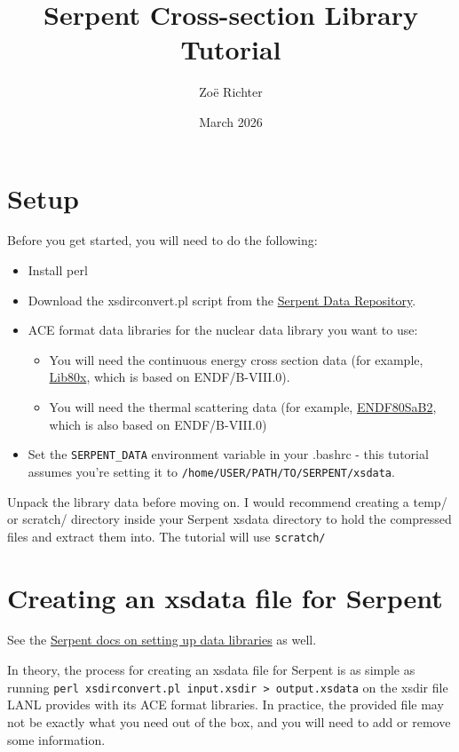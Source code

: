 \documentclass[12pt, letterpaper]{article}
\title{Serpent Cross-section Library Tutorial}
\author{Zo\"e Richter}
\date{March 2026}
\begin{document}
\maketitle

\section{Setup}
Before you get started, you will need to do the following:
\begin{itemize}
\item Install perl
\item Download the xsdirconvert.pl script from the \href{https://serpent.vtt.fi/docs/data/interaction_data.html#repository-interaction-data}{Serpent Data Repository}.
\item ACE format data libraries for the nuclear data library you want to use:
	\begin{itemize}
	\item You will need the continuous energy cross section data (for example, \href{https://nucleardata.lanl.gov/ace/lib80x}{Lib80x}, which is based on ENDF/B-VIII.0).
	\item You will need the thermal scattering data (for example, \href{https://nucleardata.lanl.gov/ace/endf80sab2}{ENDF80SaB2}, which is also based on ENDF/B-VIII.0)
	\end{itemize}
\item Set the \verb|SERPENT_DATA| environment variable in your .bashrc - this tutorial assumes you're setting it to \verb|/home/USER/PATH/TO/SERPENT/xsdata|.
\end{itemize}

Unpack the library data before moving on.  I would recommend creating a temp/ or scratch/ directory inside your Serpent xsdata directory to hold the compressed files and extract them into.  The tutorial will use \verb|scratch/|


\section{Creating an xsdata file for Serpent}
See the \href{https://serpent.vtt.fi/docs/installation/data_libraries.html#install-libraries}{Serpent docs on setting up data libraries} as well.

In theory, the process for creating an xsdata file for Serpent is as simple as running \verb|perl xsdirconvert.pl input.xsdir > output.xsdata| on the xsdir file LANL provides with its ACE format libraries.  In practice, the provided file may not be exactly what you need out of the box, and you will need to add or remove some information.
\end{document}

